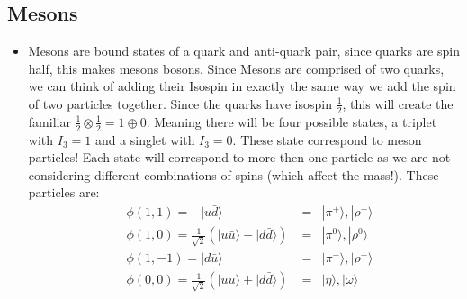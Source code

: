 \documentclass[11pt]{article}
\numberwithin{equation}{section}
\begin{document}
\subsection{Mesons} %
\label{sub:mesons}
\begin{itemize}
    \item Mesons are bound states of a quark and anti-quark pair, since quarks are spin half, this makes mesons bosons. Since Mesons are comprised of two quarks, we can think of adding their Isospin in exactly the same way we add the spin of two particles together. Since the quarks have isospin $\frac{1}{2}$, this will create the familiar $\frac{1}{2} \otimes \frac{1}{2} = 1 \oplus 0$. Meaning there will be four possible states, a triplet with $I_3=1$ and a singlet with $I_3=0$. These state correspond to meson particles! Each state will correspond to more then one particle as we are not considering different combinations of spins (which affect the mass!). These particles are:
\begin{align*}
    &\phi(1,1) = -|\! u\bar{d} \rangle \; &=& |\pi^{+} \rangle, |\rho^{+} \rangle \\ 
    &\phi(1,0) = \frac{1}{\sqrt{2}}\left(|\! u\bar{u} \rangle - |\! d\bar{d} \rangle \right) \; &=& |\pi^{0} \rangle, |\rho^{0} \rangle \\ 
    &\phi(1,-1) = |\! d\bar{u} \rangle \; &=& |\pi^{-} \rangle, |\rho^{-} \rangle \\ 
    &\phi(0,0) = \frac{1}{\sqrt{2}}\left(|\! u\bar{u} \rangle + |\! d\bar{d} \rangle \right) \; &=& |\eta \rangle, |\omega \rangle
\end{align*}

\end{itemize}
\end{document}
